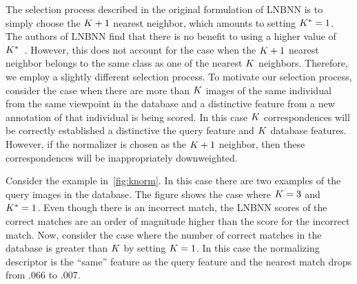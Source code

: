             The selection process described in the original formulation
              of LNBNN is to simply choose the $K + 1$\th{} nearest
              neighbor, which amounts to setting $K^{*}=1$.
            The authors of LNBNN find that there is no benefit to using
              a higher value of $K^{*}$~\cite{mccann_local_2012}.
            However, this does not account for the case when the $K +
              1$\th{} nearest neighbor belongs to the same class as one
              of the nearest $K$ neighbors.
            Therefore, we employ a slightly different selection
              process.
            To motivate our selection process, consider the case when
              there are more than $K$ images of the same individual from
              the same viewpoint in the database and a distinctive
              feature from a new annotation of that individual is being
              scored.
            In this case $K$ correspondences will be correctly
              established a distinctive the query feature and $K$
              database features.
            However, if the normalizer is chosen as the $K + 1$
              neighbor, then these correspondences will be
              inappropriately downweighted.
              
            Consider the example in~\cref{fig:knorm}.
            In this case there are two examples
               of the query images in the
              database.
            The figure shows the case where $K=3$ and $K^{*}=1$.
            Even though there is an incorrect match, the LNBNN scores
              of the correct matches are an order of magnitude higher
              than the score for the incorrect match.
            Now, consider the case where the number of correct matches
              in the database is greater than $K$ by setting $K=1$.
            In this case the normalizing descriptor is the ``same''
              feature as the query feature and the nearest match drops
              from $.066$ to $.007$.

            \knorm{}

